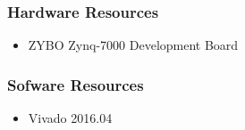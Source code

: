 \subsubsection{Hardware Resources}
\begin{itemize}
	\item ZYBO Zynq-7000 Development Board
\end{itemize}

\subsubsection{Sofware Resources}
\begin{itemize}
	\item Vivado 2016.04
\end{itemize}